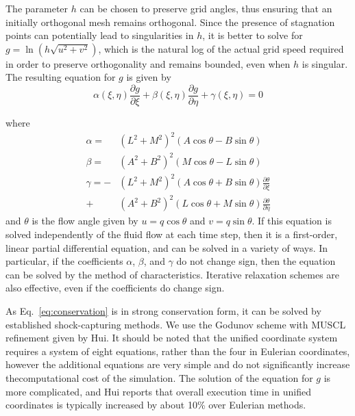 \documentclass[12pt,letterpaper]{article}
\begin{document}
The parameter $h$ can be chosen to preserve grid angles, thus ensuring
that an initially orthogonal mesh remains orthogonal. 
Since the presence of stagnation points can potentially lead to
singularities in $h$, it is better to solve for $g =
\ln\left(h\sqrt{u^2+v^2}\right)$, which is the natural log of the
actual grid speed required in order to preserve orthogonality and
remains bounded, even when $h$ is singular. The resulting equation for
$g$ is given by
\begin{equation}
\label{eq:h}
\alpha\left(\xi,\eta\right)\frac{ \partial g}{\partial \xi} + \beta\left(\xi,\eta\right)\frac{\partial g}{\partial \eta} + \gamma\left(\xi,\eta\right) = 0
\end{equation}

\noindent where 
\begin{align}
\alpha = &\left(L^2+M^2\right)^2 \left( A \cos\theta - B \sin\theta \right)\\
\beta  = &\left(A^2+B^2\right)^2 \left( M \cos\theta - L \sin\theta \right)\\
\gamma =-&\left(L^2+M^2\right)^2 \left( A \cos \theta + B \sin \theta \right) 
            \frac{\partial \theta}{\partial \xi} \\
       + &\left(A^2+B^2\right)^2 \left( L \cos \theta + M \sin \theta \right)
            \frac{\partial \theta}{\partial \eta}
\end{align}
\noindent and $\theta$ is the flow angle given by $u=q \cos\theta$  and 
$v=q\sin\theta$. If this equation is solved independently of the fluid 
flow at each time step, then it is a first-order, linear partial 
differential equation, and can be solved in a variety of ways. In 
particular, if the coefficients $\alpha$, $\beta$, and $\gamma$ do 
not change sign, then the equation can be solved by the method of 
characteristics. Iterative relaxation schemes are also effective, even 
if the coefficients do change sign.

As Eq.~\ref{eq:conservation} is in strong conservation form, it can be
solved by established shock-capturing methods. We use the Godunov
scheme with MUSCL refinement given by Hui\cite{hui99}. It should be
noted that the unified coordinate system requires a system of eight
equations, rather than the four in Eulerian coordinates, however the
additional equations are very simple and do not significantly increase
thecomputational cost of the simulation. 
The solution of the equation for $g$ is more complicated, and Hui
reports that overall execution time in unified coordinates is
typically increased by about 10\% over Eulerian methods\cite{hui07}.
\end{document}
